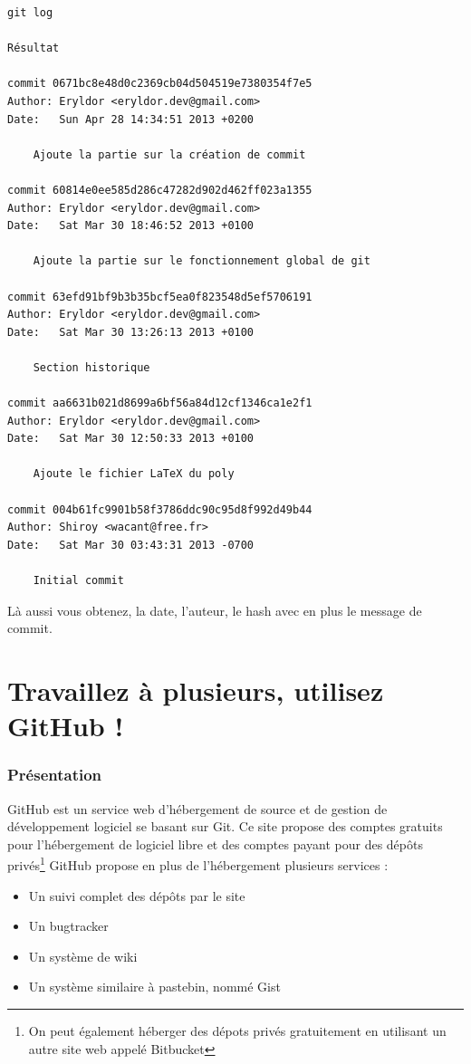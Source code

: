 \documentclass[a4paper]{article}
\begin{document}
\begin{verbatim}
git log

Résultat

commit 0671bc8e48d0c2369cb04d504519e7380354f7e5
Author: Eryldor <eryldor.dev@gmail.com>
Date:   Sun Apr 28 14:34:51 2013 +0200

    Ajoute la partie sur la création de commit

commit 60814e0ee585d286c47282d902d462ff023a1355
Author: Eryldor <eryldor.dev@gmail.com>
Date:   Sat Mar 30 18:46:52 2013 +0100

    Ajoute la partie sur le fonctionnement global de git

commit 63efd91bf9b3b35bcf5ea0f823548d5ef5706191
Author: Eryldor <eryldor.dev@gmail.com>
Date:   Sat Mar 30 13:26:13 2013 +0100

    Section historique

commit aa6631b021d8699a6bf56a84d12cf1346ca1e2f1
Author: Eryldor <eryldor.dev@gmail.com>
Date:   Sat Mar 30 12:50:33 2013 +0100

    Ajoute le fichier LaTeX du poly

commit 004b61fc9901b58f3786ddc90c95d8f992d49b44
Author: Shiroy <wacant@free.fr>
Date:   Sat Mar 30 03:43:31 2013 -0700

    Initial commit
\end{verbatim}

Là aussi vous obtenez, la date, l'auteur, le hash avec en plus le message de commit.

\part{Travaillez à plusieurs, utilisez GitHub !}

\section{Présentation}

GitHub est un service web d'hébergement de source et de gestion de développement logiciel se basant sur Git. Ce site propose des comptes gratuits pour l'hébergement de logiciel libre et des comptes payant pour des dépôts privés\footnote{On peut également héberger des dépots privés gratuitement en utilisant un autre site web appelé Bitbucket}
GitHub propose en plus de l'hébergement plusieurs services : 
\begin{itemize}
\item Un suivi complet des dépôts par le site
\item Un bugtracker
\item Un système de wiki
\item Un système similaire à pastebin, nommé Gist
\end{itemize}
\end{document}
